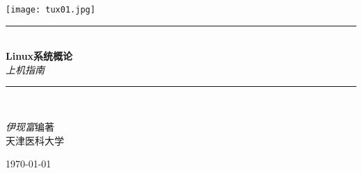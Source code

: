 \begin{titlepage}
  \begin{center}

    \texttt{[image: tux01.jpg]}\\[1cm]

    \rule{\linewidth}{0.5mm} \\[0.4cm]
    { \Huge \bfseries Linux系统概论 \\}
    { \Huge \itshape 上机指南 \\[0.4cm] }
    \rule{\linewidth}{0.5mm} \\[1.5cm]

    \noindent
    \begin{flushright}
    \LARGE
    \textit{伊现富}\quad 编著 \\
    天津医科大学
    \end{flushright}

    \vfill

    {\Large \today}

  \end{center}
  
  \newpage
  \null
  \thispagestyle{empty}
  \newpage
\end{titlepage}

